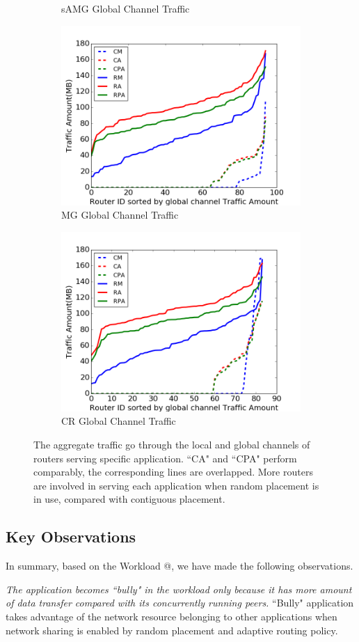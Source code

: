 \documentclass[conference,compsoc]{IEEEtran}
\makeatletter
\newcommand{\Rmnum}[1]{\expandafter\@slowromancap\romannumeral #1@}
\makeatother
\begin{document}
\begin{figure}[t]
\begin{subfigure}[t]{0.32\textwidth}
        \caption{sAMG Global Channel Traffic}
        \label{fig:syn-samg-gc-traffic}
    \end{subfigure}\hfill
    \hspace{1em}%
    \begin{subfigure}[t]{0.32\textwidth}
        \centering
        \includegraphics[height=1.5 in]{syn-wkld/mg/gc-traffic}
        \caption{MG Global Channel Traffic}
        \label{fig:syn-mg-gc-traffic}
    \end{subfigure}\hfill
    \begin{subfigure}[t]{0.32\textwidth}
        \centering
        \includegraphics[height=1.5 in]{syn-wkld/cr/gc-traffic}
        \caption{CR Global Channel Traffic}
        \label{fig:syn-cr-gc-traffic}
    \end{subfigure}%
   \caption{The aggregate traffic go through the local and global channels of routers serving specific application. ``CA" and ``CPA" perform comparably, the corresponding lines are overlapped. More routers are involved in serving each application when random placement is in use, compared with contiguous placement.}
   \label{fig:syn-3app-gc-traffic}
\end{figure}


\subsection{Key Observations}

In summary, based on the Workload \Rmnum{2}, we have made the following observations.

\emph{The application becomes ``bully" in the workload only because it has more amount of data transfer compared with its concurrently running peers.} ``Bully" application takes advantage of the network resource belonging to other applications when network sharing is enabled by random placement and adaptive routing policy. 
\end{document}
